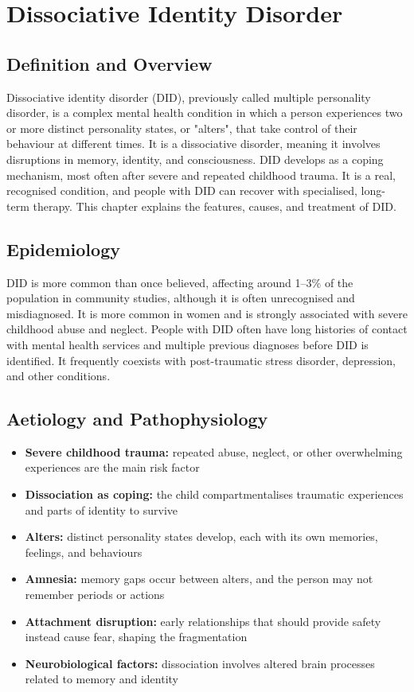 \chapter{Dissociative Identity Disorder}

\section*{Definition and Overview}
Dissociative identity disorder (DID), previously called multiple personality disorder, is a complex mental health condition in which a person experiences two or more distinct personality states, or "alters", that take control of their behaviour at different times. It is a dissociative disorder, meaning it involves disruptions in memory, identity, and consciousness. DID develops as a coping mechanism, most often after severe and repeated childhood trauma. It is a real, recognised condition, and people with DID can recover with specialised, long-term therapy. This chapter explains the features, causes, and treatment of DID.

\section*{Epidemiology}
DID is more common than once believed, affecting around 1--3\% of the population in community studies, although it is often unrecognised and misdiagnosed. It is more common in women and is strongly associated with severe childhood abuse and neglect. People with DID often have long histories of contact with mental health services and multiple previous diagnoses before DID is identified. It frequently coexists with post-traumatic stress disorder, depression, and other conditions.

\section*{Aetiology and Pathophysiology}
\begin{itemize}
    \item \textbf{Severe childhood trauma:} repeated abuse, neglect, or other overwhelming experiences are the main risk factor
    \item \textbf{Dissociation as coping:} the child compartmentalises traumatic experiences and parts of identity to survive
    \item \textbf{Alters:} distinct personality states develop, each with its own memories, feelings, and behaviours
    \item \textbf{Amnesia:} memory gaps occur between alters, and the person may not remember periods or actions
    \item \textbf{Attachment disruption:} early relationships that should provide safety instead cause fear, shaping the fragmentation
    \item \textbf{Neurobiological factors:} dissociation involves altered brain processes related to memory and identity
\end{itemize}

